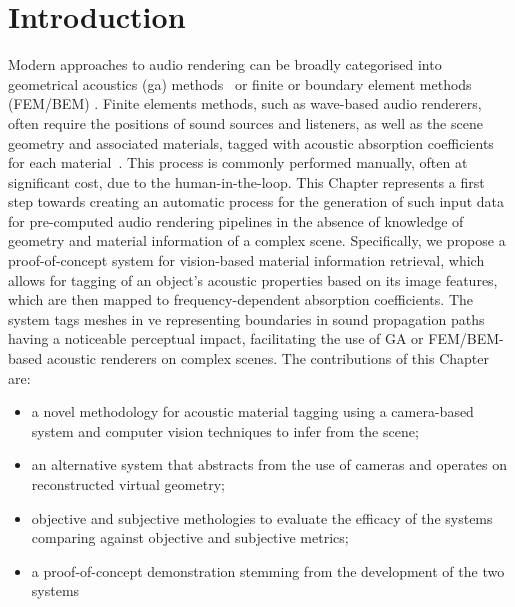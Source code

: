 \section{Introduction}
Modern approaches to audio rendering can be broadly categorised into geometrical acoustics (\acrshort{ga}) methods~\citep{savioja2015overview} or finite or boundary element methods (FEM/BEM) \citep{hulusic2012acoustic}. Finite elements methods, such as wave-based audio renderers, often require the positions of sound sources and listeners, as well as the scene geometry and associated materials, tagged with acoustic absorption coefficients for each material~\citep{deines2006comparative, raghuvanshi2014parametric}. This process is commonly performed manually, often at significant cost, due to the human-in-the-loop. This Chapter represents a first step towards creating an automatic process for the generation of such input data for pre-computed audio rendering pipelines in the absence of knowledge of geometry and material information of a complex scene. Specifically, we propose a proof-of-concept system for vision-based material information retrieval, which allows for tagging of an object's acoustic properties based on its image features, which are then mapped to frequency-dependent absorption coefficients. The system tags meshes in \acrshort{ve} representing boundaries in sound propagation paths having a noticeable perceptual impact, facilitating the use of GA or FEM/BEM-based acoustic renderers on complex scenes.
The contributions of this Chapter are:
\begin{itemize}
    \item a novel methodology for acoustic material tagging using a camera-based system and computer vision techniques to infer from the scene;
    \item an alternative system that abstracts from the use of cameras and operates on reconstructed virtual geometry;
    \item objective and subjective methologies to evaluate the efficacy of the systems comparing against objective and subjective metrics;
    \item a proof-of-concept demonstration stemming from the development of the two systems
\end{itemize}

